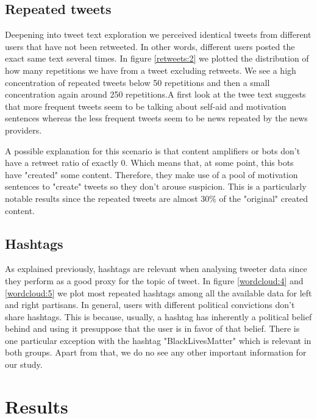 \documentclass[12pt, authoryear]{elsarticle}
\begin{document}
\subsection{Repeated tweets}
Deepening into tweet text exploration we perceived identical tweets from different users that have not been retweeted. In other words, different users posted the exact same text several times. In figure \ref{retweets:2} we plotted the distribution of how many repetitions we have from a tweet excluding retweets. We see a high concentration of repeated tweets below 50 repetitions and then a small concentration again around 250 repetitions.A first look at the twee text suggests that more frequent tweets seem to be talking about self-aid and motivation sentences whereas the less frequent tweets seem to be news repeated by the news providers.

A possible explanation for this scenario is that content amplifiers or bots don't have a retweet ratio of exactly 0. Which means that, at some point, this bots have "created" some content. Therefore, they make use of a pool of motivation sentences to "create" tweets so they don't arouse suspicion.
This is a particularly notable results since the repeated tweets are almost 30\% of the "original" created content.

\subsection{Hashtags}
As explained previously, hashtags are relevant when analysing tweeter data since they perform as a good proxy for the topic of tweet. In figure \ref{wordcloud:4} and \ref{wordcloud:5} we plot most repeated hashtags among all the available data for left and right partisans. In general, users with different political convictions don't share hashtags. This is because, usually, a hashtag has inherently a political belief behind and using it presuppose that the user is in favor of that belief. There is one particular exception with the hashtag "BlackLivesMatter" which is relevant in both groups. Apart from that, we do no see any other important information for our study.


\section{Results}
\end{document}
